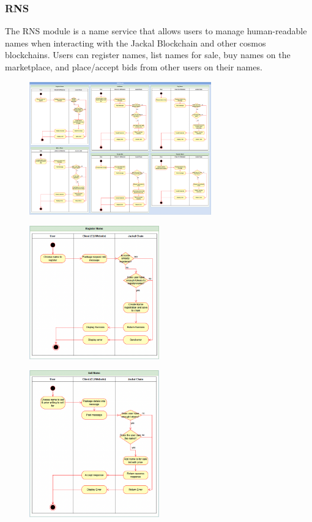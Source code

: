 \documentclass[a4paper]{article}
\begin{document}
\newpage

\subsubsection{RNS}
The RNS module is a name service that allows users to manage human-readable names when interacting with the Jackal Blockchain and other cosmos blockchains. Users can register names, list names for sale, buy names on the marketplace, and place/accept bids from other users on their names.

\begin{figure}[!htbp]
\centering
\includegraphics[width=0.7\textwidth]{assets/rns1.png}
\caption{}
\end{figure}

\begin{figure}[!htbp]
\centering
\includegraphics[width=0.5\textwidth]{assets/rns2.png}
\caption{}
\end{figure}

\begin{figure}[!htbp]
\centering
\includegraphics[width=0.5\textwidth]{assets/rns3.png}
\caption{}
\end{figure}
\end{document}
